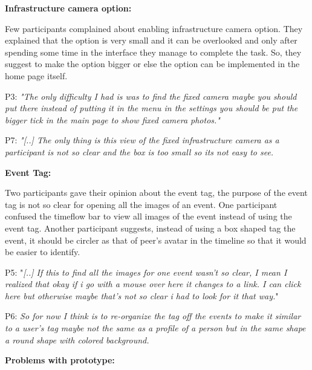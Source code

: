 \documentclass[mscthesis]{usiinfthesis}
\begin{document}
\textbf{Infrastructure camera option:}

Few participants complained about enabling infrastructure camera option. They explained that the option is very small and it can be overlooked and only after spending some time in the interface they manage to complete the task. So, they suggest to make the option bigger or else the option can be implemented in the home page itself.
\newline
\hspace{\parindent}\begin{adjustwidth}{1cm}{1cm} 

\hspace{\parindent}P3: \textit{"The only difficulty I had is was to find the fixed camera maybe you should put there instead of putting it in the menu in the settings you should be put the bigger tick in the main page to show fixed camera photos."}

P7: \textit{"[..] The only thing is this view of the fixed infrastructure camera as a participant is not so clear and the box is too small so its not easy to see.}
\newline
\end{adjustwidth}

\textbf{Event Tag:}

Two participants gave their opinion about the event tag, the purpose of the event tag is not so clear for opening all the images of an event. One participant confused the timeflow bar to view all images of the event instead of using the event tag. Another participant suggests, instead of using a box shaped tag the event, it should be circler as that of peer's avatar in the timeline so that it would be easier to identify.
\newline
\begin{adjustwidth}{1cm}{1cm}
\hspace{\parindent}P5: "\textit{[..] If this to find all the images for one event wasn't so clear, I mean I realized that okay if i go with a mouse over here it changes to a link. I can click here but otherwise maybe that's not so clear i had to look for it that way.}"

P6: \textit{So for now I think is to re-organize the tag off the events to make it similar to a user's tag maybe not the same as a profile of a person but in the same shape a round shape with colored background.}
\newline
\end{adjustwidth}

\textbf{Problems with prototype: }
\end{document}
